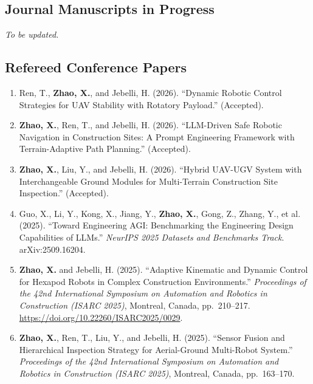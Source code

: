 \documentclass[11pt,a4paper]{article}
\begin{document}
\subsection*{Journal Manuscripts in Progress}

\textit{To be updated.}

\subsection*{Refereed Conference Papers}
\begin{enumerate}[leftmargin=1.5em, resume]
    \item Ren, T., \textbf{Zhao, X.}, and Jebelli, H. (2026). ``Dynamic Robotic Control Strategies for UAV Stability with Rotatory Payload.'' (Accepted).

    \item \textbf{Zhao, X.}, Ren, T., and Jebelli, H. (2026). ``LLM-Driven Safe Robotic Navigation in Construction Sites: A Prompt Engineering Framework with Terrain-Adaptive Path Planning.'' (Accepted).

    \item \textbf{Zhao, X.}, Liu, Y., and Jebelli, H. (2026). ``Hybrid UAV-UGV System with Interchangeable Ground Modules for Multi-Terrain Construction Site Inspection.'' (Accepted).

    \item Guo, X., Li, Y., Kong, X., Jiang, Y., \textbf{Zhao, X.}, Gong, Z., Zhang, Y., et al. (2025). ``Toward Engineering AGI: Benchmarking the Engineering Design Capabilities of LLMs.'' \textit{NeurIPS 2025 Datasets and Benchmarks Track}. arXiv:2509.16204.

    \item \textbf{Zhao, X.} and Jebelli, H. (2025). ``Adaptive Kinematic and Dynamic Control for Hexapod Robots in Complex Construction Environments.'' \textit{Proceedings of the 42nd International Symposium on Automation and Robotics in Construction (ISARC 2025)}, Montreal, Canada, pp.\ 210--217. \href{https://doi.org/10.22260/ISARC2025/0029}{https://doi.org/10.22260/ISARC2025/0029}.

    \item \textbf{Zhao, X.}, Ren, T., Liu, Y., and Jebelli, H. (2025). ``Sensor Fusion and Hierarchical Inspection Strategy for Aerial-Ground Multi-Robot System.'' \textit{Proceedings of the 42nd International Symposium on Automation and Robotics in Construction (ISARC 2025)}, Montreal, Canada, pp.\ 163--170.


\end{enumerate}
\end{document}
